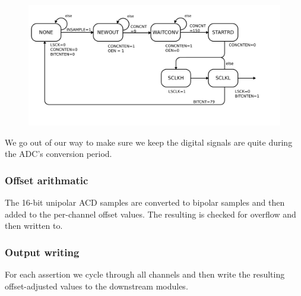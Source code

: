 \begin{figure}
\label{adcfsm}
\begin{centering}
\includegraphics[scale=0.7]{adc.inputFSM.svg}
\end{centering}
\end{figure}

We go out of our way to make sure we keep the digital signals are quite during the ADC's conversion period. 

\subsubsection{Offset arithmatic}
The 16-bit unipolar ACD samples are converted to bipolar samples and then added to the per-channel offset values. The resulting  is checked for overflow and then written to. 

\subsubsection{Output writing}
For each  assertion we cycle through all channels and then write the resulting offset-adjusted values to the downstream modules. 
